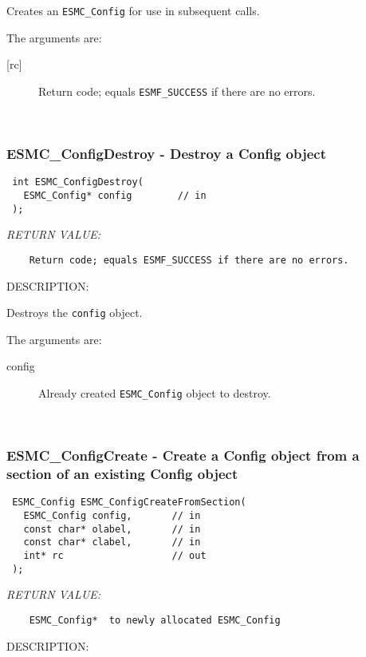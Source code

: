     Creates an {\tt ESMC\_Config} for use in subsequent calls.
  
     The arguments are:
     \begin{description}
     \item [{[rc]}]
       Return code; equals {\tt ESMF\_SUCCESS} if there are no errors.
     \end{description}
   
 
\mbox{}\hrulefill\ 
 
\subsubsection [ESMC\_ConfigDestroy] {ESMC\_ConfigDestroy - Destroy a Config object}


  
\begin{verbatim} int ESMC_ConfigDestroy(
   ESMC_Config* config        // in
 );\end{verbatim}{\em RETURN VALUE:}
\begin{verbatim}    Return code; equals ESMF_SUCCESS if there are no errors.\end{verbatim}
{\sf DESCRIPTION:\\ }


    Destroys the {\tt config} object.
  
     The arguments are:
     \begin{description}
     \item [config]
       Already created {\tt ESMC\_Config} object to destroy.
     \end{description}
   
 
\mbox{}\hrulefill\ 
 
\subsubsection [ESMC\_ConfigCreate] {ESMC\_ConfigCreate - Create a Config object from a section of an existing Config object}


  
\begin{verbatim} ESMC_Config ESMC_ConfigCreateFromSection(
   ESMC_Config config,       // in
   const char* olabel,       // in
   const char* clabel,       // in
   int* rc                   // out
 );\end{verbatim}{\em RETURN VALUE:}
\begin{verbatim}    ESMC_Config*  to newly allocated ESMC_Config\end{verbatim}
{\sf DESCRIPTION:\\ }


